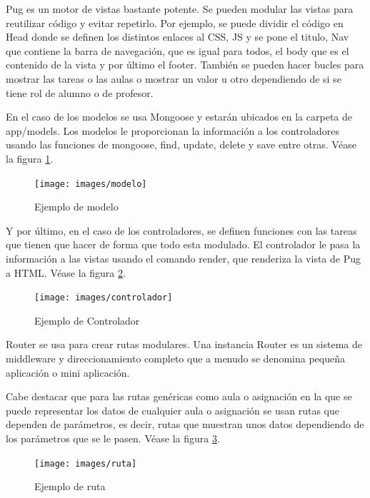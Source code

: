 Pug es un motor de vistas bastante potente. Se pueden modular las vistas para reutilizar código y evitar repetirlo.
Por ejemplo, se puede dividir el código en Head donde se definen los distintos enlaces al CSS, JS y se pone el titulo, 
Nav que contiene la barra de navegación, que es igual para todos, el body que es el contenido de la vista y por último el footer.
También se pueden hacer bucles para mostrar las tareas o las aulas o mostrar un valor u otro dependiendo de si se tiene rol de alumno o de profesor.

\newpage

En el caso de los modelos se usa Mongoose y estarán ubicados en la carpeta de app/models. Los modelos le proporcionan la información a los controladores usando las funciones de mongoose, find, update, delete y save entre otras.
Véase la figura \ref{fig:Ejemplo de modelo}.

\begin{figure}[!th]
\begin{center}
\texttt{[image: images/modelo]}
\caption{Ejemplo de modelo}
\label{fig:Ejemplo de modelo}
\end{center}
\end{figure}

Y por último, en el caso de los controladores, se definen funciones con las tareas que tienen que hacer
de forma que todo esta modulado. El controlador le pasa la información a las vistas usando el comando render, que renderiza la vista de Pug a HTML.
Véase la figura \ref{fig:Ejemplo de Controlador}.

\begin{figure}[!th]
\begin{center}
\texttt{[image: images/controlador]}
\caption{Ejemplo de Controlador}
\label{fig:Ejemplo de Controlador}
\end{center}
\end{figure}

Router se usa para crear rutas modulares. Una instancia Router es un sistema de middleware y direccionamiento completo que a menudo se denomina pequeña aplicación o mini aplicación.

Cabe destacar que para las rutas genéricas como aula o asignación en la que se puede representar los datos de cualquier aula o asignación se usan rutas que dependen de parámetros, es decir, rutas que muestran unos datos dependiendo de los parámetros que se le pasen.
Véase la figura \ref{fig:Ejemplo de ruta}.

\begin{figure}[!th]
\begin{center}
\texttt{[image: images/ruta]}
\caption{Ejemplo de ruta}
\label{fig:Ejemplo de ruta}
\end{center}
\end{figure}

